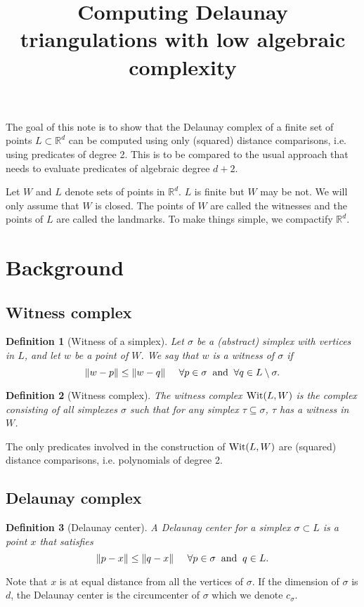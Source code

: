 \documentclass[11pt,a4paper]{article}
\newtheorem{definition}{Definition}
\newcommand{\R}{\mathbb R}
\newcommand{\wit}{{\rm Wit}}
\begin{document}
\title{Computing Delaunay triangulations with low algebraic complexity}
\maketitle

The goal of this note is to show that the Delaunay complex of a finite
set of points $L\subset\R^d$ can be computed using only (squared)
distance comparisons, i.e. using predicates of degree 2. This is to be
compared to the usual approach that needs to evaluate predicates of
algebraic degree $d+2$.

Let $W$ and $L$ denote sets of points in $\R ^d$. $L$ is finite but
$W$ may be not. We will only assume that $W$ is closed. The points of $W$ are called the witnesses and the
points of $L$ are called the landmarks. To make things simple, we
compactify $\R^d$.

 
\section{Background}

\subsection{Witness complex}


\begin{definition}[Witness of a simplex]
  Let $\sigma$ be a (abstract)  simplex with vertices in $L$, and let $w$ be a point
  of $W$. We say that $w$ is a witness of $\sigma$ if 
$$\| w-p\|
  \leq \| w -q \| \;\;\;\;\; \forall p\in \sigma \;\; {\rm  and}\;\;
  \forall q\in L\setminus
  \sigma.$$
\end{definition}


\begin{definition}[Witness complex]
  The witness complex $\wit (L,W)$ is the complex consisting of all
  simplexes $\sigma$ such that for any simplex $\tau\subseteq
  \sigma$, $\tau$ has a witness in $W$.
\end{definition}

The only predicates involved in the construction of $\wit (L,W)$ are
(squared) distance comparisons, i.e. polynomials of degree 2.

\subsection{Delaunay complex}

\begin{definition}[Delaunay center]
A Delaunay center for a simplex $\sigma\subset L$ is a point $x$ that
satisfies
\[ \| p-x\| \leq \| q-x\|\;\;\;\;\;\forall p\in\sigma \;\; {\rm and} \;\;
q\in L.\]
\end{definition}
Note that $x$ is at equal distance from all the vertices of $\sigma$.
If the dimension of $\sigma$ is $d$, the Delaunay center is the
circumcenter of $\sigma$ which we denote $c_{\sigma}$.
\end{document}
